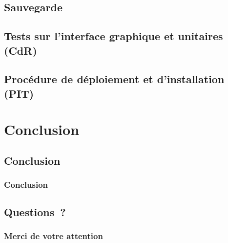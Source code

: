 \documentclass[10pt,fleqn]{beamer}
\begin{document}
\subsection[Sauvegarde]{Sauvegarde}
\begin{frame}
\tableofcontents[subsectionstyle=show/shaded/hide, subsubsectionstyle=hide, sectionstyle=show/hide]
\end{frame}


\subsection[Tests sur l'interface graphique et unitaires (CdR)]{Tests sur l'interface graphique et unitaires (CdR)}
\begin{frame}
\tableofcontents[subsectionstyle=show/shaded/hide, subsubsectionstyle=hide, sectionstyle=show/hide]
\end{frame}


\subsection[Procédure de déploiement et d'installation (PIT)]{Procédure de déploiement et d'installation (PIT)}
\begin{frame}
\tableofcontents[subsectionstyle=show/shaded/hide, subsubsectionstyle=hide, sectionstyle=show/hide]
\end{frame}
\begin{frame}
\end{frame}

\section*[Conclusion]{Conclusion}

\subsection[Conclusion]{Conclusion}
\begin{frame}
	\frametitle{Conclusion}
\end{frame}

\subsection[Questions~?]{Questions~?}
\begin{frame}
	\frametitle{Merci de votre attention}
\end{frame}
\end{document}
